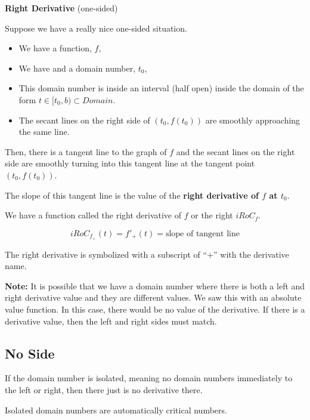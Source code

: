 \documentclass{ximera}
\begin{document}
\begin{definition} \textbf{\textcolor{green!50!black}{Right Derivative}}  (one-sided) 


Suppose we have a really nice one-sided situation.


\begin{itemize}
\item We have a function, $f$, 
\item We have and a domain number, $t_0$, 
\item This domain number is inside an interval (half open) inside the domain of the form  $t \in [t_0, b) \subset Domain$. 
\item The secant lines on the right side of $(t_0, f(t_0))$ are smoothly approaching the same line.
\end{itemize}

Then, there is a tangent line to the graph of $f$ and the secant lines on the right side are smoothly turning into this tangent line at the tangent point $(t_0, f(t_0))$. 

The slope of this tangent line is the value of the \textbf{right derivative of $f$ at $t_0$}.


We have a function called the right derivative of $f$ or the right $iRoC_f$. 

\[
iRoC_{f_{+}}(t) =f'_{+}(t) = \text{slope of tangent line}
\]


The right derivative is symbolized with a subscript of ``+'' with the derivative name. 

\end{definition}



\textbf{Note:} It is possible that we have a domain number where there is both a left and right derivative value and they are different values.  We saw this with an absolute value function. In this case, there would be no value of the derivative.  If there is a derivative value, then the left and right sides must match.  





\subsection*{No Side}


If the domain number is isolated, meaning no domain numbers immediately to the left or right, then there just is no derivative there. 

Isolated domain numbers are automatically critical numbers.
\end{document}
